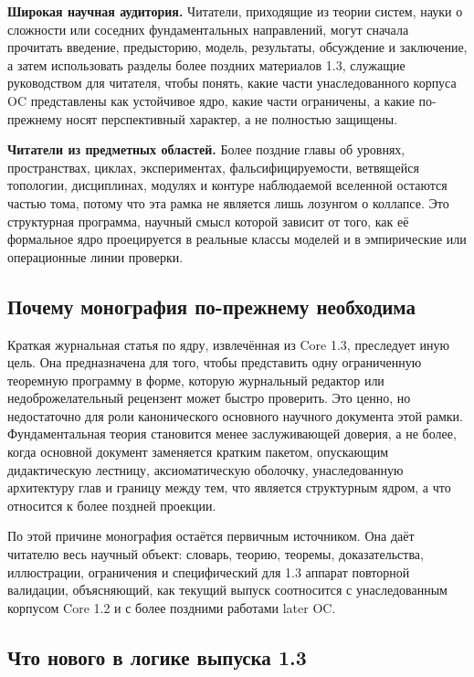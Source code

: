 \textbf{Широкая научная аудитория.}
Читатели, приходящие из теории систем, науки о сложности или соседних фундаментальных направлений, могут сначала прочитать введение, предысторию, модель, результаты, обсуждение и заключение, а затем использовать разделы более поздних материалов 1.3, служащие руководством для читателя, чтобы понять, какие части унаследованного корпуса OC представлены как устойчивое ядро, какие части ограничены, а какие по-прежнему носят перспективный характер, а не полностью защищены.

\textbf{Читатели из предметных областей.}
Более поздние главы об уровнях, пространствах, циклах, экспериментах, фальсифицируемости, ветвящейся топологии, дисциплинах, модулях и контуре наблюдаемой вселенной остаются частью тома, потому что эта рамка не является лишь лозунгом о коллапсе. Это структурная программа, научный смысл которой зависит от того, как её формальное ядро проецируется в реальные классы моделей и в эмпирические или операционные линии проверки.

\subsection{Почему монография по-прежнему необходима}

Краткая журнальная статья по ядру, извлечённая из Core 1.3, преследует иную цель.
Она предназначена для того, чтобы представить одну ограниченную теоремную программу в форме, которую журнальный редактор или недоброжелательный рецензент может быстро проверить. Это ценно, но недостаточно для роли канонического основного научного документа этой рамки. Фундаментальная теория становится менее заслуживающей доверия, а не более, когда основной документ заменяется кратким пакетом, опускающим дидактическую лестницу, аксиоматическую оболочку, унаследованную архитектуру глав и границу между тем, что является структурным ядром, а что относится к более поздней проекции.

По этой причине монография остаётся первичным источником. Она даёт читателю весь научный объект: словарь, теорию, теоремы, доказательства, иллюстрации, ограничения и специфический для 1.3 аппарат повторной валидации, объясняющий, как текущий выпуск соотносится с унаследованным корпусом Core 1.2 и с более поздними работами later OC.

\subsection{Что нового в логике выпуска 1.3}


